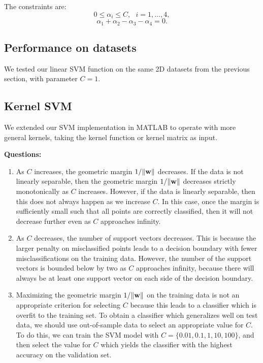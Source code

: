 The constraints are:
%
\begin{equation}
0 \leq \alpha_i \leq C,~~~i=1,\ldots ,4,
\end{equation}
\begin{equation}
\alpha_1 + \alpha_2 - \alpha_3 - \alpha_4 = 0.
\end{equation}

\subsection{Performance on datasets}

We tested our linear SVM function on the same 2D datasets from the previous section, with parameter $C = 1$.  


\subsection{Kernel SVM}

We extended our SVM implementation in MATLAB to operate with more general kernels, taking the kernel function or kernel matrix as input.  

{\bf Questions:}
\begin{enumerate}[label=(\alph*)]
	\item As $C$ increases, the geometric margin $1/\|\boldsymbol{\mathbf{w}}\|$ decreases.  If the data is not linearly separable, then
	the geometric margin $1/\|\boldsymbol{\mathbf{w}}\|$ decreases strictly monotonically as $C$ increases.  However, if the data is linearly
	separable, then this does not always happen as we increase $C$.  In this case, once the margin is sufficiently small
	such that all points are correctly classified, then it will not decrease further even as $C$ approaches infinity.  
	
	\item As $C$ decreases, the number of support vectors decreases.  This is because the larger penalty on misclassified
	points leads to a decision boundary with fewer misclassifications on the training data.  However, the number of the
	support vectors is bounded below by two as $C$ approaches infinity, because there will always be at least one support vector
	on each side of the decision boundary.
	
	\item Maximizing the geometric margin $1/\|\boldsymbol{\mathbf{w}}\|$ on the training data is not an appropriate criterion for selecting
	$C$ because this leads to a classifier which is overfit to the training set.  To obtain a classifier which generalizes well
	on test data, we should use out-of-sample data to select an appropriate value for $C$.  To do this, we can train the SVM model
	with $C = \{0.01,0.1,1,10,100\}$, and then select the value for $C$ which yields the classifier with the highest
	accuracy on the validation set.  

\end{enumerate}

